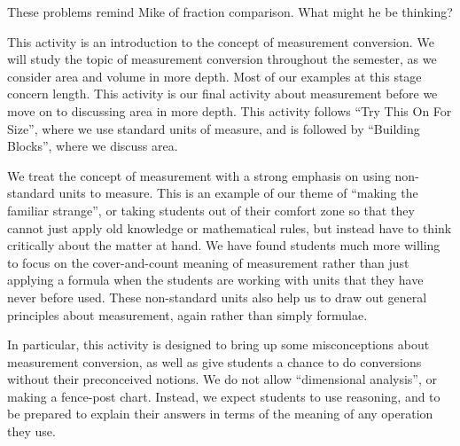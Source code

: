 \documentclass{ximera}
\begin{document}
\begin{problem} \label{BackAndForth3}
These problems remind Mike of fraction comparison.  What might he be thinking?


\end{problem}

\newpage
\begin{instructorNotes}
This activity is an introduction to the concept of measurement conversion.  We will study the topic of measurement conversion throughout the semester, as we consider area and volume in more depth.  Most of our examples at this stage concern length.  This activity is our final activity about measurement before we move on to discussing area in more depth.  This activity follows ``Try This On For Size'', where we use standard units of measure, and is followed by ``Building Blocks'', where we discuss area.

We treat the concept of measurement with a strong emphasis on using non-standard units to measure.  This is an example of our theme of ``making the familiar strange'', or taking students out of their comfort zone so that they cannot just apply old knowledge or mathematical rules, but instead have to think critically about the matter at hand.  We have found students much more willing to focus on the cover-and-count meaning of measurement rather than just applying a formula when the students are working with units that they have never before used.  These non-standard units also help us to draw out general principles about measurement, again rather than simply formulae.

In particular, this activity is designed to bring up some misconceptions about measurement conversion, as well as give students a chance to do conversions without their preconceived notions.  We do not allow ``dimensional analysis'', or making a fence-post chart.  Instead, we expect students to use reasoning, and to be prepared to explain their answers in terms of the meaning of any operation they use.


\end{instructorNotes}
\end{document}
